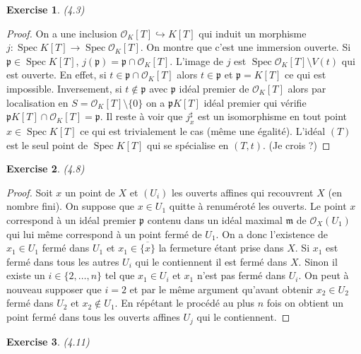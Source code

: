 \documentclass[A4, 11pt]{article}
\newtheorem{exer}{Exercise}
\def\Spec{ \operatorname{Spec}}
\begin{document}
\begin{exer}(4.3)
\end{exer}
\begin{proof}
On a une inclusion $\mathcal{O}_K[T] \hookrightarrow K[T]$ qui induit un morphisme 
$j\colon \Spec K[T] \rightarrow \Spec \mathcal{O}_K [T]$. On montre que c'est une immersion ouverte. Si $\mathfrak{p}\in \Spec K[T]$, $j(\mathfrak{p})=\mathfrak{p}\cap \mathcal{O}_K[T]$. L'image de $j$ est $\Spec \mathcal{O}_K[T] \setminus V(t)$ qui est ouverte. En effet, si $t\in \mathfrak{p}\cap \mathcal{O}_K[T]$ alors $t\in \mathfrak{p}$ et $\mathfrak{p}=K[T]$ ce qui est impossible. Inversement, si $t\notin \mathfrak{p}$ avec $\mathfrak{p}$ idéal premier de $\mathcal{O}_K[T]$ alors par localisation en $S=\mathcal{O}_K[T]\setminus \{0\}$ on a $\mathfrak{p}K[T]$ idéal premier qui vérifie $\mathfrak{p}K[T]\cap \mathcal{O}_K[T]=\mathfrak{p}$. Il reste à voir que $j^{\sharp}_x$ est un isomorphisme en tout point $x\in \Spec K[T]$ ce qui est trivialement le cas (même une égalité). L'idéal $(T)$ est le seul point de $\Spec K[T]$ qui se spécialise en $(T,t)$. (Je crois ?)
\end{proof}
\begin{exer}(4.8)
\end{exer}
\begin{proof}
Soit $x$ un point de $X$ et $(U_i)$ les ouverts affines qui recouvrent $X$ (en nombre fini). On suppose que $x\in U_1$ quitte à renuméroté les ouverts. Le point $x$ correspond à un idéal premier $\mathfrak{p}$ contenu dans un idéal maximal $\mathfrak{m}$ de $\mathcal{O}_X(U_1)$ qui lui même correspond à un point fermé de $U_1$. On a donc l'existence de $x_1\in U_1$ fermé dans $U_1$ et $x_1\in \overline{\{x\}}$ la fermeture étant prise dans $X$. Si $x_1$ est fermé dans tous les autres $U_i$ qui le contiennent il est fermé dans $X$. Sinon il existe un $i\in \{2,\dots , n\}$ tel que $x_1\in U_i$ et $x_1$ n'est pas fermé dans $U_i$. On peut à nouveau supposer que $i=2$ et par le même argument qu'avant obtenir $x_2\in U_2$ fermé dans $U_2$ et $x_2\notin U_1$. En répétant le procédé au plus $n$ fois on obtient un point fermé dans tous les ouverts affines $U_j$ qui le contiennent.
\end{proof}
\begin{exer}(4.11)

\end{exer}
\end{document}
